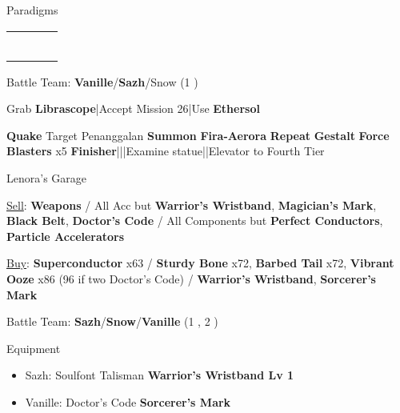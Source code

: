 \begin{menu}
	\item Paradigms
	\begin{tabular}{cccl}
		\syn          & \chrole{\rav} & \chrole{\sen} &          \\
		\com          & \chrole{\rav} & \chrole{\rav} &          \\
		\chrole{\rav} & \chrole{\rav} & \chrole{\sen} &          \\
		\com          & \chrole{\rav} & \com          &  \\
		\rav          & \sab          & \chrole{\sen} &          \\
		\com          & \rav          & \com          &
	\end{tabular}
	\item Battle Team: \textbf{Vanille}/\textbf{Sazh}/Snow (1 )
\end{menu}
\begin{mainlist}
	\item Grab \textbf{Librascope}|Accept Mission 26|Use \textbf{Ethersol}
	\item {} \textbf{Quake} \to Target Penanggalan \to \textbf{Summon} \to \textbf{Fira-Aerora} \to [6] \textbf{Repeat} \to \textbf{Gestalt} \to \textbf{Force Blasters} x5 \to \textbf{Finisher}|\skip|\skip|Examine statue|\skip|Elevator to Fourth Tier
\end{mainlist}
\begin{shop}{Lenora's Garage}
	\item \underline{Sell}: \textbf{Weapons} / All Acc but \textbf{Warrior's Wristband}, \textbf{Magician's Mark}, \textbf{Black Belt}, \textbf{Doctor's Code} / All Components but \textbf{Perfect Conductors}, \textbf{Particle Accelerators}
	\item \underline{Buy}: \textbf{Superconductor} x63 / \textbf{Sturdy Bone} x72, \textbf{Barbed Tail} x72, \textbf{Vibrant Ooze} x86 (96 if two Doctor's Code) / \textbf{Warrior's Wristband}, \textbf{Sorcerer's Mark}
\end{shop}
\begin{menu}
	\item Battle Team: \textbf{Sazh}/\textbf{Snow}/\textbf{Vanille} (1 , 2 )
	\item Equipment
	\begin{itemize}
		\item Sazh: Soulfont Talisman \to \textbf{Warrior's Wristband Lv 1}
		\item Vanille: Doctor's Code \to \textbf{Sorcerer's Mark}
	\end{itemize}
\end{menu}
